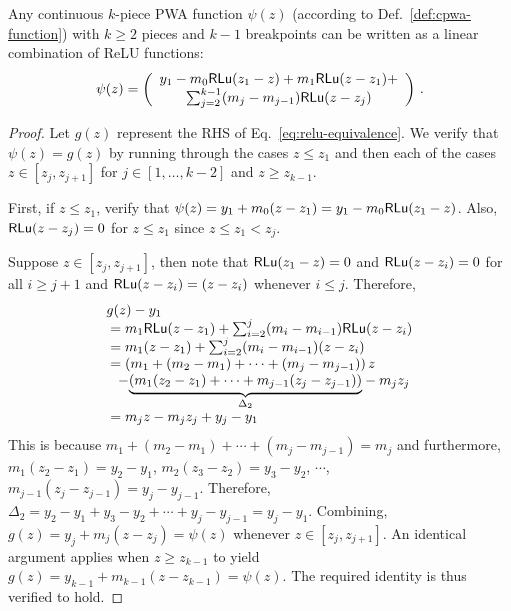 \begin{theorem}\label{thm:relu-encoding}
Any continuous $k$-piece PWA function $\psi(z)$ (according to Def.~\ref{def:cpwa-function}) with $k \geq 2$ pieces and $k-1$ breakpoints can be written as a linear combination of ReLU functions: 
\begin{equation}\label{eq:relu-equivalence}
   \psi(z) = \left( \begin{array}{c}
y_1 - m_0 \mathsf{RLu}(z_1 - z) +  m_1 \mathsf{RLu}(z - z_1) + \\
\sum_{j=2}^{k-1} (m_j - m_{j-1}) \mathsf{RLu}(z -z_j) 
\end{array}\right) \,.
\end{equation}
\end{theorem}
\begin{proof}
Let $g(z) $ represent the RHS of Eq.~\eqref{eq:relu-equivalence}. We verify that $\psi(z) = g(z)$ by running through the cases $z \leq z_1$ and then each of the cases $ z \in [z_j, z_{j+1}]$ for $j \in [1, \ldots, k-2]$ and $z \geq z_{k-1}$.

First, if $z \leq z_1$, verify that $\psi(z) = y_1 + m_0( z - z_1) = y_1 - m_0 \mathsf{RLu}(z_1 - z)$. Also, $\mathsf{RLu}(z - z_j) = 0$ for $z \leq z_1$ since $z \leq z_1 < z_j$.

Suppose $z \in [z_j, z_{j+1}]$, then note that $\mathsf{RLu}(z_1 - z) = 0$ and
$\mathsf{RLu}(z - z_i) = 0$ for all $i \geq j+1$ and $\mathsf{RLu}(z - z_i) = (z -z_i) $ whenever $i \leq j$. Therefore, 
\[ \begin{array}{l}
g(z)  - y_1 \\
\; =  m_1 \mathsf{RLu}(z - z_1) + \sum_{i=2}^{j} (m_i - m_{i-1}) \mathsf{RLu}(z - z_i) \\ 
\; =  m_1 (z - z_1) +  \sum_{i=2}^{j} (m_i - m_{i-1}) (z - z_i) \\ 
\; =  \left( m_1 + (m_2 - m_1) + \cdots + (m_j - m_{j - 1}) \right) z  \\ 
\;\;\;- \underset{\Delta_2}{\underbrace{( m_1 (z_2 - z_1) + \cdots + m_{j-1}(z_{j} - z_{j-1}) )}} - m_j z_j \\ 
\; =  m_j z  - m_j z_j + y_{j} - y_1
\end{array}\]
This is because $m_1 + (m_2 - m_1) + \cdots + (m_j - m_{j-1}) = m_j$ and 
furthermore, $m_1 (z_2 - z_1) = y_2 - y_1$, $m_2 (z_3 - z_2) = y_3 - y_2 $, $\cdots$, $m_{j-1}(z_{j} - z_{j-1}) = y_{j} - y_{j-1}$. Therefore, $\Delta_2 = y_2 - y_1 + y_3 - y_2 + \cdots + y_j - y_{j-1} = y_j - y_1$. Combining, 
$g(z) = y_j + m_j (z - z_j) = \psi(z)$ whenever $z \in [z_j, z_{j+1}]$. An identical argument applies when $z \geq z_{k-1}$ to yield $g(z) = y_{k-1}+ m_{k-1} (z - z_{k-1}) = \psi(z)$. The required identity is thus verified to hold. 
\end{proof}

